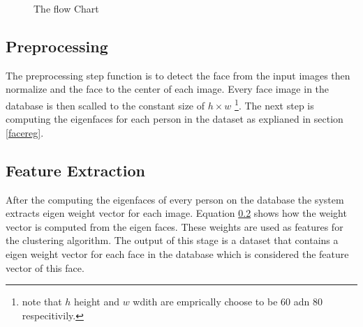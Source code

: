 \documentclass[a4paper,twoside]{article}
\begin{document}
\begin{figure}
 \begin{center}
 \centering

\caption{ The flow Chart}
\label{Blockchart}
 \end{center}\end{figure}
\subsection{Preprocessing}
The preprocessing step function is to detect the face from the input images then normalize and the face to the center of each  image.  Every face image in the database is  then scalled to the constant size of $h \times w$ \footnote{ note that  $h$ height and $w$ wdith are emprically choose to be 60 adn 80 respecitivily.}. The next step is computing the eigenfaces for each person in the dataset as explianed in section \ref{facereg}.


\subsection{Feature Extraction}

After the computing the eigenfaces of every person on the database the system extracts eigen weight vector for each image. Equation \ref{} shows how the weight vector is computed from the eigen faces. These weights are used as features for the clustering algorithm. The output of this stage is a dataset that contains a eigen weight vector for each face in the database which is considered the feature vector of this face. 
\end{document}
